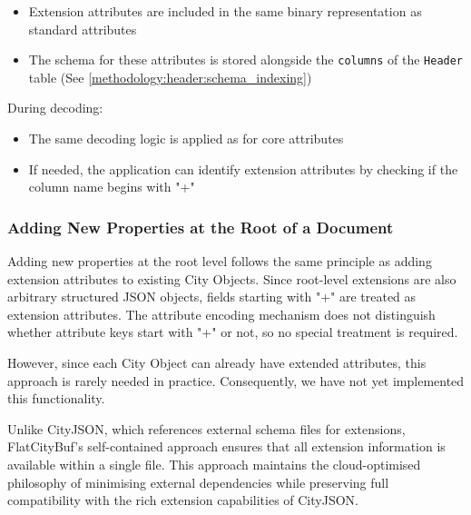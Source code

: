 \begin{itemize}
  \item Extension attributes are included in the same binary representation as standard attributes
  \item The schema for these attributes is stored alongside the \texttt{columns} of the \texttt{Header} table (See \autoref{methodology:header:schema_indexing})
\end{itemize}

During decoding:
\begin{itemize}
  \item The same decoding logic is applied as for core attributes
  \item If needed, the application can identify extension attributes by checking if the column name begins with "+"
\end{itemize}

\subsubsection{Adding New Properties at the Root of a Document}
\label{methodology:feature_encoding:extension_mechanism:adding_new_properties_at_the_root_of_a_document}

Adding new properties at the root level follows the same principle as adding extension attributes to existing City Objects. Since root-level extensions are also arbitrary structured JSON objects, fields starting with "+" are treated as extension attributes. The attribute encoding mechanism does not distinguish whether attribute keys start with "+" or not, so no special treatment is required.

However, since each City Object can already have extended attributes, this approach is rarely needed in practice. Consequently, we have not yet implemented this functionality.

Unlike CityJSON, which references external schema files for extensions, FlatCityBuf's self-contained approach ensures that all extension information is available within a single file. This approach maintains the cloud-optimised philosophy of minimising external dependencies while preserving full compatibility with the rich extension capabilities of CityJSON.
